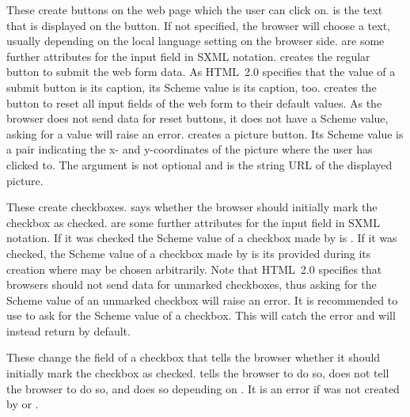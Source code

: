 \begin{desc}
  These create buttons on the web page which the user can click on.
   is the text that is displayed on the button.  If not
  specified, the browser will choose a text, usually depending on the
  local language setting on the browser side.   are
  some further attributes for the input field in SXML notation.
   creates the regular button to submit the web
  form data.  As HTML~2.0 specifies that the value of a submit button
  is its caption, its Scheme value is its caption, too.
   creates the button to reset all input fields
  of the web form to their default values.  As the browser does not
  send data for reset buttons, it does not have a Scheme value, \ie
  asking for a value will raise an error.  
  creates a picture button.  Its Scheme value is a pair indicating the
  x- and y-coordinates of the picture where the user has clicked to.
  The argument  is not optional and is the string
  URL of the displayed picture.
\end{desc}

\begin{desc}
  These create checkboxes.   says whether the browser
  should initially mark the checkbox as checked.   are
  some further attributes for the input field in SXML notation.  If it
  was checked the Scheme value of a checkbox made by
   is \sharpt.  If it was checked, the Scheme value
  of a checkbox made by  is its
   provided during its creation where  may be
  chosen arbitrarily.  Note that HTML~2.0 specifies that browsers
  should not send data for unmarked checkboxes, thus asking for the
  Scheme value of an unmarked checkbox will raise an error.  It is
  recommended to use  to ask for the Scheme
  value of a checkbox.  This will catch the error and will instead
  return \sharpf by default.
\end{desc}

\begin{desc}
  These change the  field of a checkbox that tells the
  browser whether it should initially mark the checkbox as checked.
   tells the browser to do so,
   does not tell the browser to do so, and
   does so depending on .  It
  is an error if  was not created by
   or .
\end{desc}


